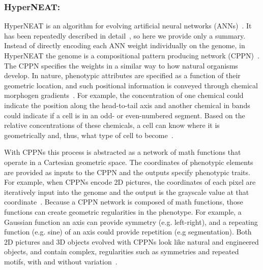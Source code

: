 
\subsubsection{HyperNEAT:}

HyperNEAT is an algorithm for evolving artificial neural networks (ANNs)~\cite{stanley2009hypercube}. It has been repeatedly described in detail~\cite{stanley2009hypercube,gauci2007generating,clune2011performance},  so here we provide only a summary. Instead of directly encoding each ANN weight individually on the genome, in HyperNEAT the genome is a compositional pattern producing network (CPPN)~\cite{stanley2007CPPN}. The CPPN specifies the weights in a similar way to how natural organisms develop. In nature, phenotypic attributes are specified as a function of their geometric location, and such positional information is conveyed through chemical morphogen gradients~\cite{carroll2005endless}. For example, the concentration of one chemical could indicate the position along the head-to-tail axis and another chemical in bands could indicate if a cell is in an odd- or even-numbered segment. Based on the relative concentrations of these chemicals, a cell can know where it is geometrically and, thus, what type of cell to become~\cite{carroll2005endless}. 

With CPPNs this process is abstracted as a network of math functions that operate in a Cartesian geometric space. The coordinates of phenotypic elements are provided as inputs to the CPPN and the outputs specify phenotypic traits. For example, when CPPNs encode 2D pictures, the coordinates of each pixel are iteratively input into the genome and the output is the grayscale value at that coordinate~\cite{secretan2011picbreeder}. Because a CPPN network is composed of math functions, those functions can create geometric regularities in the phenotype. For example, a Gaussian function an axis can provide symmetry (e.g. left-right), and a repeating function (e.g. sine) of an axis could provide repetition (e.g segmentation). Both 2D pictures and 3D objects evolved with CPPNs look like natural and engineered objects, and contain complex, regularities such as symmetries and repeated motifs, with and without variation~\cite{secretan2011picbreeder,clune2011objects}. 



